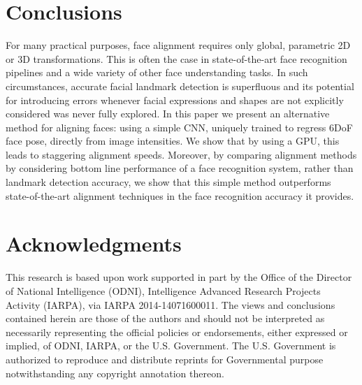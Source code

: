 \documentclass[10pt,twocolumn,letterpaper]{article}
\begin{document}
\section{Conclusions}\label{sec:conclusions}
For many practical purposes, face alignment requires only global, parametric 2D or 3D transformations. This is often the case in state-of-the-art face recognition pipelines and a wide variety of other face understanding tasks. In such circumstances, accurate facial landmark detection is superfluous and its potential for introducing errors whenever facial expressions and shapes are not explicitly considered was never fully explored. In this paper we present an alternative method for aligning faces: using a simple CNN, uniquely trained to regress 6DoF face pose, directly from image intensities. We show that by using a GPU, this leads to staggering alignment speeds. Moreover, by comparing alignment methods by considering bottom line performance of a face recognition system, rather than landmark detection accuracy, we show that this simple method outperforms state-of-the-art alignment techniques in the face recognition accuracy it provides.

\section*{Acknowledgments}
This research is based upon work supported in part by the Office of the Director of National Intelligence (ODNI), Intelligence Advanced Research Projects Activity (IARPA), via IARPA 2014-14071600011. The views and conclusions contained herein are those of the authors and should not be interpreted as necessarily representing the official policies or endorsements, either expressed or implied, of ODNI, IARPA, or the U.S. Government.  The U.S. Government is authorized to reproduce and distribute reprints for Governmental purpose notwithstanding any copyright annotation thereon.
\end{document}
